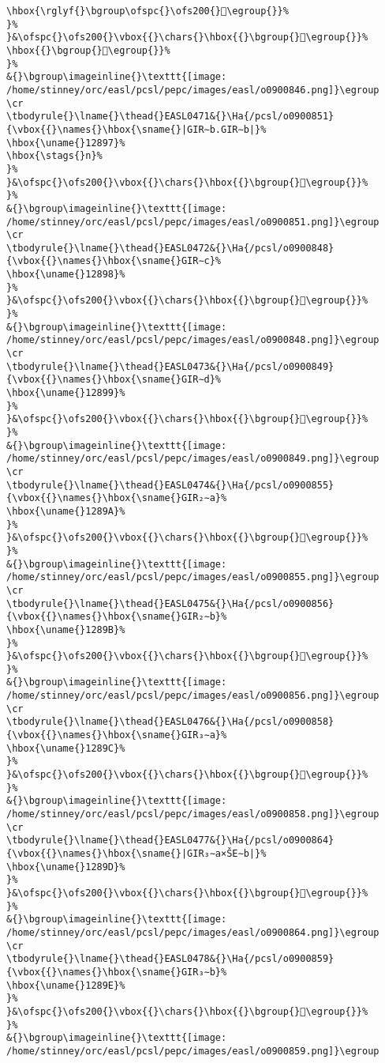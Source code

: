 \begin{verbatim}
\hbox{\rglyf{}\bgroup\ofspc{}\ofs200{}𒢖\egroup{}}%
}%
}&\ofspc{}\ofs200{}\vbox{{}\chars{}\hbox{{}\bgroup{}𒢕\egroup{}}%
\hbox{{}\bgroup{}𒢖\egroup{}}%
}%
&{}\bgroup\imageinline{}\texttt{[image: /home/stinney/orc/easl/pcsl/pepc/images/easl/o0900846.png]}\egroup
\cr
\tbodyrule{}\lname{}\thead{}EASL0471&{}\Ha{/pcsl/o0900851}{\vbox{{}\names{}\hbox{\sname{}|GIR∼b.GIR∼b|}%
\hbox{\uname{}12897}%
\hbox{\stags{}n}%
}%
}&\ofspc{}\ofs200{}\vbox{{}\chars{}\hbox{{}\bgroup{}𒢗\egroup{}}%
}%
&{}\bgroup\imageinline{}\texttt{[image: /home/stinney/orc/easl/pcsl/pepc/images/easl/o0900851.png]}\egroup
\cr
\tbodyrule{}\lname{}\thead{}EASL0472&{}\Ha{/pcsl/o0900848}{\vbox{{}\names{}\hbox{\sname{}GIR∼c}%
\hbox{\uname{}12898}%
}%
}&\ofspc{}\ofs200{}\vbox{{}\chars{}\hbox{{}\bgroup{}𒢘\egroup{}}%
}%
&{}\bgroup\imageinline{}\texttt{[image: /home/stinney/orc/easl/pcsl/pepc/images/easl/o0900848.png]}\egroup
\cr
\tbodyrule{}\lname{}\thead{}EASL0473&{}\Ha{/pcsl/o0900849}{\vbox{{}\names{}\hbox{\sname{}GIR∼d}%
\hbox{\uname{}12899}%
}%
}&\ofspc{}\ofs200{}\vbox{{}\chars{}\hbox{{}\bgroup{}𒢙\egroup{}}%
}%
&{}\bgroup\imageinline{}\texttt{[image: /home/stinney/orc/easl/pcsl/pepc/images/easl/o0900849.png]}\egroup
\cr
\tbodyrule{}\lname{}\thead{}EASL0474&{}\Ha{/pcsl/o0900855}{\vbox{{}\names{}\hbox{\sname{}GIR₂∼a}%
\hbox{\uname{}1289A}%
}%
}&\ofspc{}\ofs200{}\vbox{{}\chars{}\hbox{{}\bgroup{}𒢚\egroup{}}%
}%
&{}\bgroup\imageinline{}\texttt{[image: /home/stinney/orc/easl/pcsl/pepc/images/easl/o0900855.png]}\egroup
\cr
\tbodyrule{}\lname{}\thead{}EASL0475&{}\Ha{/pcsl/o0900856}{\vbox{{}\names{}\hbox{\sname{}GIR₂∼b}%
\hbox{\uname{}1289B}%
}%
}&\ofspc{}\ofs200{}\vbox{{}\chars{}\hbox{{}\bgroup{}𒢛\egroup{}}%
}%
&{}\bgroup\imageinline{}\texttt{[image: /home/stinney/orc/easl/pcsl/pepc/images/easl/o0900856.png]}\egroup
\cr
\tbodyrule{}\lname{}\thead{}EASL0476&{}\Ha{/pcsl/o0900858}{\vbox{{}\names{}\hbox{\sname{}GIR₃∼a}%
\hbox{\uname{}1289C}%
}%
}&\ofspc{}\ofs200{}\vbox{{}\chars{}\hbox{{}\bgroup{}𒢜\egroup{}}%
}%
&{}\bgroup\imageinline{}\texttt{[image: /home/stinney/orc/easl/pcsl/pepc/images/easl/o0900858.png]}\egroup
\cr
\tbodyrule{}\lname{}\thead{}EASL0477&{}\Ha{/pcsl/o0900864}{\vbox{{}\names{}\hbox{\sname{}|GIR₃∼a×ŠE∼b|}%
\hbox{\uname{}1289D}%
}%
}&\ofspc{}\ofs200{}\vbox{{}\chars{}\hbox{{}\bgroup{}𒢝\egroup{}}%
}%
&{}\bgroup\imageinline{}\texttt{[image: /home/stinney/orc/easl/pcsl/pepc/images/easl/o0900864.png]}\egroup
\cr
\tbodyrule{}\lname{}\thead{}EASL0478&{}\Ha{/pcsl/o0900859}{\vbox{{}\names{}\hbox{\sname{}GIR₃∼b}%
\hbox{\uname{}1289E}%
}%
}&\ofspc{}\ofs200{}\vbox{{}\chars{}\hbox{{}\bgroup{}𒢞\egroup{}}%
}%
&{}\bgroup\imageinline{}\texttt{[image: /home/stinney/orc/easl/pcsl/pepc/images/easl/o0900859.png]}\egroup

\end{verbatim}

